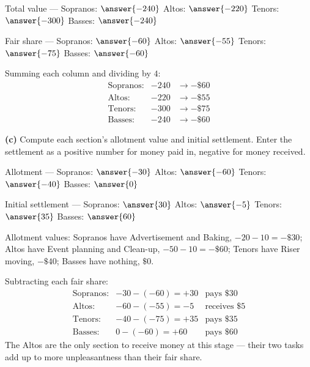 \documentclass[12pt]{ximera}
\begin{document}
\begin{problem}
\begin{prompt}
Total value --- Sopranos: $\answer{-240}$ \quad Altos: $\answer{-220}$ \quad
Tenors: $\answer{-300}$ \quad Basses: $\answer{-240}$

\smallskip
Fair share --- Sopranos: $\answer{-60}$ \quad Altos: $\answer{-55}$ \quad
Tenors: $\answer{-75}$ \quad Basses: $\answer{-60}$

\begin{feedback}
Summing each column and dividing by $4$:
\[
\begin{array}{lll}
\text{Sopranos}: & -240 & \to -\$60\\
\text{Altos}: & -220 & \to -\$55\\
\text{Tenors}: & -300 & \to -\$75\\
\text{Basses}: & -240 & \to -\$60
\end{array}
\]
\end{feedback}
\end{prompt}

\begin{prompt}
\textbf{(c)} Compute each section's allotment value and initial settlement. Enter the
settlement as a positive number for money paid in, negative for money received.

Allotment --- Sopranos: $\answer{-30}$ \quad Altos: $\answer{-60}$ \quad
Tenors: $\answer{-40}$ \quad Basses: $\answer{0}$

\smallskip
Initial settlement --- Sopranos: $\answer{30}$ \quad Altos: $\answer{-5}$ \quad
Tenors: $\answer{35}$ \quad Basses: $\answer{60}$

\begin{feedback}
Allotment values: Sopranos have Advertisement and Baking, $-20-10 = -\$30$; Altos have
Event planning and Clean-up, $-50-10 = -\$60$; Tenors have Riser moving, $-\$40$;
Basses have nothing, $\$0$.

Subtracting each fair share:
\[
\begin{array}{llll}
\text{Sopranos}: & -30 - (-60) = +30 & \text{pays } \$30\\
\text{Altos}: & -60 - (-55) = -5 & \text{receives } \$5\\
\text{Tenors}: & -40 - (-75) = +35 & \text{pays } \$35\\
\text{Basses}: & 0 - (-60) = +60 & \text{pays } \$60
\end{array}
\]
The Altos are the only section to receive money at this stage --- their two tasks add up
to more unpleasantness than their fair share.
\end{feedback}
\end{prompt}


\end{problem}
\end{document}
